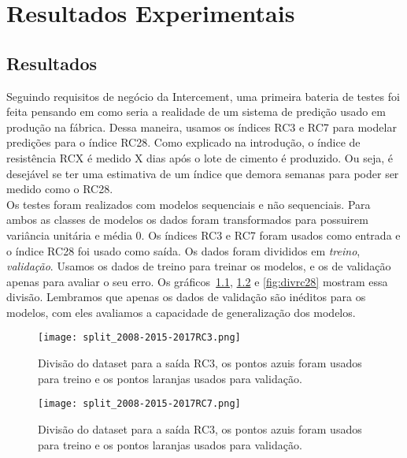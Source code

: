 
\chapter{Resultados Experimentais }
\label{cap:resultados}

\section{Resultados}





Seguindo requisitos de negócio da Intercement, uma primeira
bateria de testes foi feita pensando em como seria a realidade de um sistema de
predição usado em produção na fábrica. Dessa maneira, usamos os índices RC3 e
RC7 para modelar predições para o índice RC28. Como explicado na introdução, o
índice de resistência RCX é medido X dias após o lote de cimento é produzido. Ou
seja, é desejável se ter uma estimativa de um índice que demora semanas para
poder ser medido como o RC28. \\


Os testes foram realizados com modelos sequenciais e não sequenciais. Para ambos
as classes de modelos os dados foram transformados para possuirem variância
unitária e média 0. Os índices RC3 e RC7 foram usados como entrada e o índice
RC28 foi usado como saída. Os dados foram divididos em
\textit{treino}, \textit{validação}. Usamos os dados de treino 
para treinar os
modelos, e os de validação apenas para avaliar o seu erro. Os
gráficos~\ref{fig:divrc3}, \ref{fig:divrc7} e \ref{fig:divrc28} mostram essa divisão. Lembramos que apenas os dados de
validação são inéditos para os modelos, com eles avaliamos a capacidade de
generalização dos modelos. 


\begin{figure}[H]
  \centering
  \texttt{[image: split\_2008-2015-2017RC3.png]}
\caption{Divisão do dataset para a saída RC3, os pontos azuis foram usados para
treino e os pontos laranjas usados para validação.}
  \label{fig:divrc3}
\end{figure}


\begin{figure}[H]
  \centering
\texttt{[image: split\_2008-2015-2017RC7.png]}
\caption{Divisão do dataset para a saída RC3, os pontos azuis foram usados para
treino e os pontos laranjas usados para validação.}
  \label{fig:divrc7}
\end{figure}

